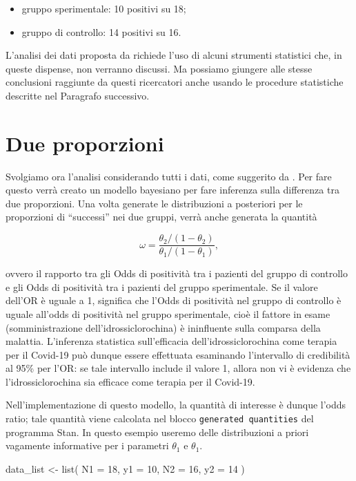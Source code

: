\documentclass[
  11pt,
]{krantz}
\makeatletter
\newenvironment{Shaded}{\begin{snugshade}}{\end{snugshade}}
\newcommand{\AttributeTok}[1]{\textcolor[rgb]{0.61,0.61,0.61}{#1}}
\newcommand{\DecValTok}[1]{\textcolor[rgb]{0.06,0.06,0.06}{#1}}
\newcommand{\FunctionTok}[1]{\textcolor[rgb]{0,0,0}{#1}}
\newcommand{\NormalTok}[1]{#1}
\newcommand{\OtherTok}[1]{\textcolor[rgb]{0.37,0.37,0.37}{#1}}
\providecommand{\tightlist}{%
  \setlength{\itemsep}{0pt}\setlength{\parskip}{0pt}}
\newenvironment{kframe}{%
\medskip{}
\setlength{\fboxsep}{.8em}
 \def\at@end@of@kframe{}%
 \ifinner\ifhmode%
  \def\at@end@of@kframe{\end{minipage}}%
  \begin{minipage}{\columnwidth}%
 \fi\fi%
 \def\FrameCommand##1{\hskip\@totalleftmargin \hskip-\fboxsep
 \colorbox{shadecolor}{##1}\hskip-\fboxsep
     \hskip-\linewidth \hskip-\@totalleftmargin \hskip\columnwidth}%
 \MakeFramed {\advance\hsize-\width
   \@totalleftmargin\z@ \linewidth\hsize
   \@setminipage}}%
 {\par\unskip\endMakeFramed%
 \at@end@of@kframe}
\renewenvironment{Shaded}{\begin{kframe}}{\end{kframe}}
\theoremstyle{definition}
\theoremstyle{definition}
\theoremstyle{definition}
\theoremstyle{definition}
\theoremstyle{remark}
\makeatother
\begin{document}
\begin{itemize}
\tightlist
\item
  gruppo sperimentale: 10 positivi su 18;
\item
  gruppo di controllo: 14 positivi su 16.
\end{itemize}

L'analisi dei dati proposta da \citet{Hulme_2020} richiede l'uso di alcuni strumenti statistici che, in queste dispense, non verranno discussi. Ma possiamo giungere alle stesse conclusioni raggiunte da questi ricercatori anche usando le procedure statistiche descritte nel Paragrafo successivo.

\hypertarget{due-proporzioni}{%
\section{Due proporzioni}\label{due-proporzioni}}

Svolgiamo ora l'analisi considerando tutti i dati, come suggerito da \citet{Hulme_2020}. Per fare questo verrà creato un modello bayesiano per fare inferenza sulla differenza tra due proporzioni. Una volta generate le distribuzioni a posteriori per le proporzioni di ``successi'' nei due gruppi, verrà anche generata la quantità

\[
\omega = \frac{\theta_2 / (1-\theta_2)}{\theta_1 / (1-\theta_1)},
\]

ovvero il rapporto tra gli Odds di positività tra i pazienti del gruppo di controllo e gli Odds di positività tra i pazienti del gruppo sperimentale. Se il valore dell'OR è uguale a 1, significa che l'Odds di positività nel gruppo di controllo è uguale all'odds di positività nel gruppo sperimentale, cioè il fattore in esame (somministrazione dell'idrossiclorochina) è ininfluente sulla comparsa della malattia. L'inferenza statistica sull'efficacia dell'idrossiclorochina come terapia per il Covid-19 può dunque essere effettuata esaminando l'intervallo di credibilità al 95\% per l'OR: se tale intervallo include il valore 1, allora non vi è evidenza che l'idrossiclorochina sia efficace come terapia per il Covid-19.

Nell'implementazione di questo modello, la quantità di interesse è dunque l'odds ratio; tale quantità viene calcolata nel blocco \texttt{generated\ quantities} del programma Stan. In questo esempio useremo delle distribuzioni a priori vagamente informative per i parametri \(\theta_1\) e \(\theta_1\).

\begin{Shaded}
\begin{Highlighting}[]
\NormalTok{data\_list }\OtherTok{\textless{}{-}} \FunctionTok{list}\NormalTok{(}
  \AttributeTok{N1 =} \DecValTok{18}\NormalTok{, }
  \AttributeTok{y1 =} \DecValTok{10}\NormalTok{, }
  \AttributeTok{N2 =} \DecValTok{16}\NormalTok{, }
  \AttributeTok{y2 =} \DecValTok{14}
\NormalTok{)}
\end{Highlighting}
\end{Shaded}
\end{document}
